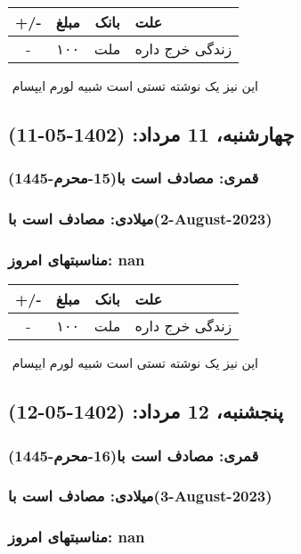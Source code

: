 \documentclass{article}
\newcommand{\rnote}[1]{\marginpar{\textcolor{color}{\StrSubstitute{\##1}{ }{\_}}}}
\newcommand{\myRow}[4]{
    #1 & #2 & #3 & #4 \\ \hline
}
\begin{document}
\begin{tabular}{ | c | c | c | p{5cm} |}
    \hline
    \myRow{ +/- }{مبلغ}{بانک}{علت}
    \myRow{-}{۱۰۰}{ملت}{زندگی خرج داره}
\end{tabular}
\newline
\newline

‌
\rnote{تست}
این نیز یک نوشته تستی است شبیه لورم ایپسام




\newpage
{}
\textcolor{color}{
\section{ چهارشنبه، 11 مرداد: (1402-05-11) }
\subsubsection*{قمری: مصادف است با(15-محرم-1445)} 
\subsubsection*{میلادی: مصادف است با(2-August-2023)}
\subsubsection*{مناسبتهای امروز: nan}
}


\begin{tabular}{ | c | c | c | p{5cm} |}
    \hline
    \myRow{ +/- }{مبلغ}{بانک}{علت}
    \myRow{-}{۱۰۰}{ملت}{زندگی خرج داره}
\end{tabular}
\newline
\newline

‌
\rnote{تست}
این نیز یک نوشته تستی است شبیه لورم ایپسام




\newpage
{}
\textcolor{color}{
\section{ پنجشنبه، 12 مرداد: (1402-05-12) }
\subsubsection*{قمری: مصادف است با(16-محرم-1445)} 
\subsubsection*{میلادی: مصادف است با(3-August-2023)}
\subsubsection*{مناسبتهای امروز: nan}
}
\end{document}
